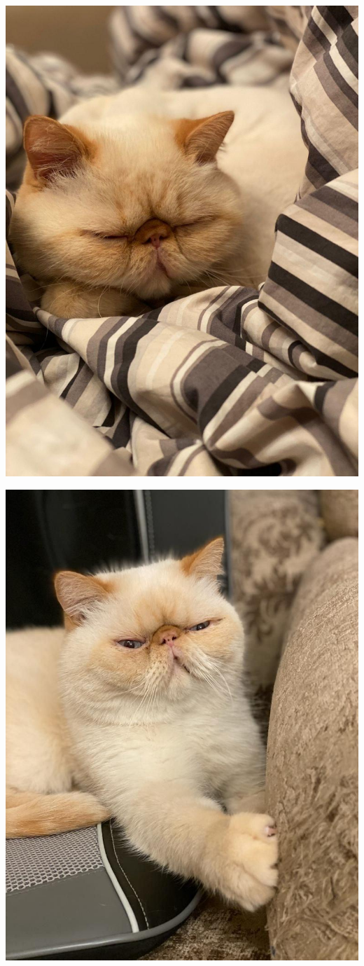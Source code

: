 \documentclass[a4paper,12pt]{article}
\begin{document}
\begin{center}
\includegraphics[scale=0.5]{8.jpg}
\end{center}
\begin{center}
\includegraphics[scale=0.6]{7.jpg}
\end{center}
\end{document}
